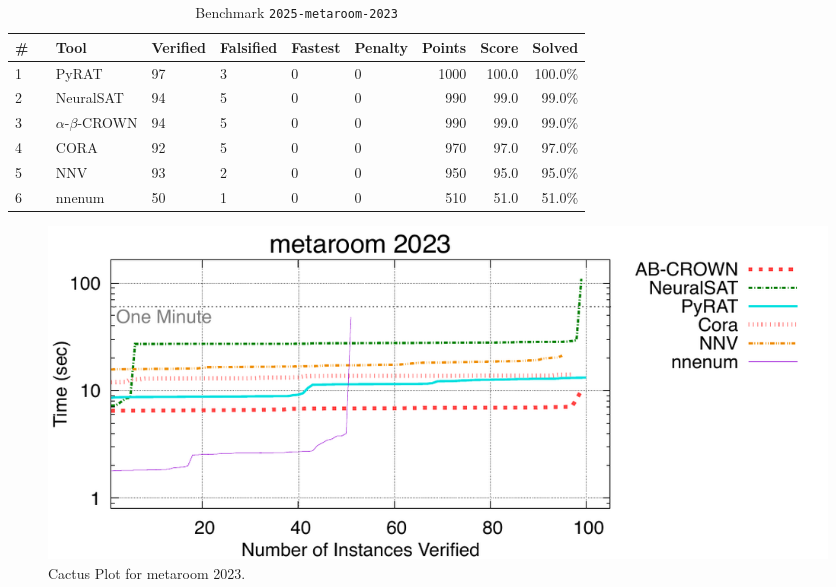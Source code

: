 \begin{table}[h]
\begin{center}
\caption{Benchmark \texttt{2025-metaroom-2023}} \label{tab:cat_2025_metaroom_2023}
{\setlength{\tabcolsep}{2pt}
\begin{tabular}[h]{@{}llllllrrr@{}}
\toprule
\textbf{\# ~} & \textbf{Tool} & \textbf{Verified} & \textbf{Falsified} & \textbf{Fastest} & \textbf{Penalty} & \textbf{Points} & \textbf{Score} & \textbf{Solved}\\
\midrule
1 & PyRAT & 97 & 3 & 0 & 0 & 1000 & 100.0 & 100.0\% \\
2 & NeuralSAT & 94 & 5 & 0 & 0 & 990 & 99.0 & 99.0\% \\
3 & $\alpha$-$\beta$-CROWN & 94 & 5 & 0 & 0 & 990 & 99.0 & 99.0\% \\
4 & CORA & 92 & 5 & 0 & 0 & 970 & 97.0 & 97.0\% \\
5 & NNV & 93 & 2 & 0 & 0 & 950 & 95.0 & 95.0\% \\
6 & nnenum & 50 & 1 & 0 & 0 & 510 & 51.0 & 51.0\% \\
\bottomrule
\end{tabular}
}
\end{center}
\end{table}



\begin{figure}[h]
\centerline{\includegraphics[width=\textwidth]{cactus/2025_metaroom_2023.pdf}}
\caption{Cactus Plot for metaroom 2023.}
\label{fig:quantPic}
\end{figure}


\clearpage

